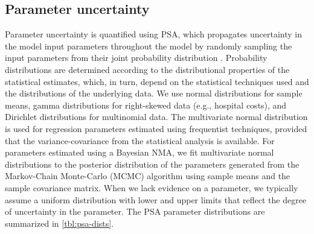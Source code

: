 \documentclass[11pt,final,fleqn]{article}
\theoremstyle{plain}
\begin{document}
\subsection{Parameter uncertainty}\label{parameter-uncertainty}
Parameter uncertainty is quantified using PSA, which propagates uncertainty in the model input parameters throughout the model by randomly sampling the input parameters from their joint probability distribution \citep{baio2015probabilistic, claxton2005probabilistic}. Probability distributions are determined according to the distributional properties of the statistical estimates, which, in turn, depend on the statistical techniques used and the distributions of the underlying data. We use normal distributions for sample means, gamma distributions for right-skewed data (e.g., hospital costs), and Dirichlet distributions for multinomial data. The multivariate normal distribution is used for regression parameters estimated using frequentist techniques, provided that the variance-covariance from the statistical analysis is available. For parameters estimated using a Bayesian NMA, we fit multivariate normal distributions to the posterior distribution of the parameters generated from the Markov-Chain Monte-Carlo (MCMC) algorithm using sample means and the sample covariance matrix. When we lack evidence on a parameter, we typically assume a uniform distribution with lower and upper limits that reflect the degree of uncertainty in the parameter. The PSA parameter distributions are summarized in \autoref{tbl:psa-dists}. 
\end{document}
